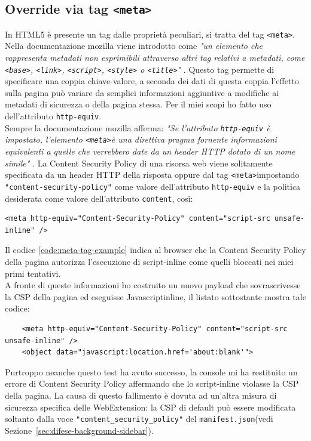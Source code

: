 \documentclass{sapthesis}
\newcommand{\code}[1]{\texttt{#1}}
\newcommand{\refSection}[1]{Sezione~\ref{#1}}
\newcommand{\JS}{Javascript}
\newcommand{\manifest}{\code{manifest.json}}
\newcommand{\tagHTML}[1]{\code{<#1>}}
\newcommand{\meta}{\tagHTML{meta}}
\newcommand{\script}{\tagHTML{script}}
\begin{document}
        \subsection{Override via tag \meta}
        \label{sec:attaccando-vuln-bypass-meta}
            In HTML5 è presente un tag dalle proprietà peculiari, si tratta del tag \meta.
            Nella documentazione mozilla viene introdotto come \textit{"un elemento che rappresenta 
            metadati non esprimibili attraverso altri tag relativi a metadati, come \code{<base>}, 
            \code{<link>}, \script, \code{<style>} o \code{<title>}"} \cite{tag-meta}.
            Questo tag permette di specificare una coppia chiave-valore, a seconda dei dati di
            questa coppia l'effetto sulla pagina può variare da semplici informazioni aggiuntive
            a modifiche ai metadati di sicurezza o della pagina stessa. Per il miei scopi ho fatto
            uso dell'attributo \code{http-equiv}.\\
            Sempre la documentazione mozilla afferma: \textit{"Se l'attributo \code{http-equiv} è impostato,
            l'elemento \meta è una direttiva pragma fornente informazioni equivalenti a quelle che
            verrebbero date da un header HTTP dotato di un nome simile"} \cite{tag-meta}. La Content
            Security Policy di una risorsa web viene solitamente specificata da un header HTTP della
            risposta oppure dal tag \meta impostando \code{"content-security-policy"} come valore
            dell'attributo \code{http-equiv} e la politica desiderata come valore dell'attributo \code{content},
            così:
            \begin{lstlisting}[label=code:meta-tag-example]
<meta http-equiv="Content-Security-Policy" content="script-src unsafe-inline" />
\end{lstlisting}
            Il codice \ref{code:meta-tag-example} indica al browser che la Content Security Policy della
            pagina autorizza l'esecuzione di script-inline come quelli bloccati nei miei primi tentativi.\\
            A fronte di queste informazioni ho costruito un nuovo payload che sovrascrivesse la CSP della
            pagina ed eseguisse \JS inline, il listato sottostante mostra tale codice:
            \begin{lstlisting}
    <meta http-equiv="Content-Security-Policy" content="script-src unsafe-inline" />
    <object data="javascript:location.href='about:blank'">
\end{lstlisting}
            Purtroppo neanche questo test ha avuto successo, la console mi ha restituito un errore di Content
            Security Policy affermando che lo script-inline violasse la CSP della pagina. La causa
            di questo fallimento è dovuta ad un'altra misura di sicurezza specifica delle WebExtension: la CSP
            di default può essere modificata soltanto dalla voce \code{"content\_security\_policy"} del 
            \manifest (vedi \refSection{sec:difese-background-sidebar}).\\
        
\end{document}
